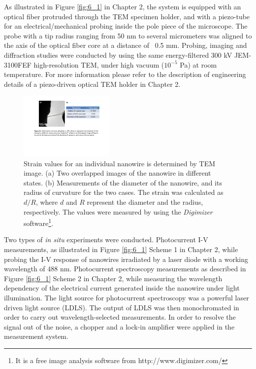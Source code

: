 As illustrated in Figure \ref{fig:6_1} in Chapter 2, the system is equipped with an optical fiber protruded through the TEM specimen holder, and with a piezo-tube for an electrical/mechanical probing inside the pole piece of the microscope. 
The probe with a tip radius ranging from 50 nm to several micrometers was aligned to the axis of the optical fiber core at a distance of ~0.5 mm. 
Probing, imaging and diffraction studies were conducted by using the same energy-filtered 300 kV JEM-3100FEF high-resolution TEM, under high vacuum ($10^{-5}$ Pa) at room temperature. 
For more information please refer to the description of engineering details of a piezo-driven optical TEM holder in Chapter 2.\\

\begin{figure}  
\includegraphics[width=130pt,angle=-90]{figures/figure6_s2}
\caption[Strain value]
{Strain values for an individual nanowire is determined by TEM image. 
(a) Two overlapped images of the nanowire in different states. 
(b) Measurements of the diameter of the nanowire, and its radius of curvature for the two cases. The strain was calculated as $d/R$, where $d$ and $R$ represent the diameter and the radius, respectively. The values were measured by using the {\em Digimizer} software\footnote{It is a free image analysis software from http://www.digimizer.com/}.
\label{fig:6_s2}}
\end{figure}

Two types of {\em in situ} experiments were conducted. 
Photocurrent I-V measurements, as illustrated in Figure \ref{fig:6_1} Scheme 1 in Chapter 2, while probing the I-V response of nanowires irradiated by a laser diode with a working wavelength of 488 nm. 
Photocurrent spectroscopy measurements as described in Figure \ref{fig:6_1} Scheme 2 in Chapter 2, while measuring the wavelength dependency of the electrical current generated inside the nanowire under light illumination. 
The light source for photocurrent spectroscopy was a powerful laser driven light source (LDLS). The output of LDLS was then monochromated in order to carry out wavelength-selected measurements. 
In order to resolve the signal out of the noise, a chopper and a lock-in amplifier were applied in the measurement system. \\

